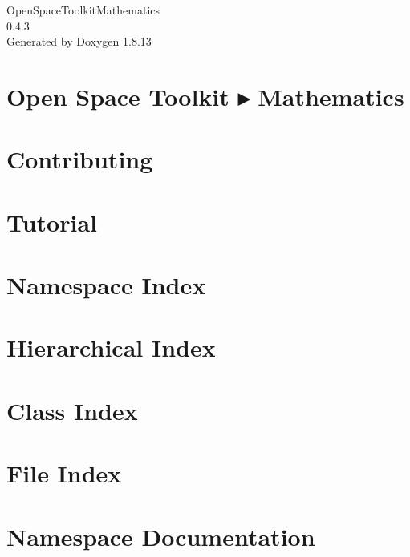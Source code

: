 \documentclass[twoside]{book}
\newcommand{\+}{\discretionary{\mbox{\scriptsize$\hookleftarrow$}}{}{}}
\newcommand{\clearemptydoublepage}{%
  \newpage{\pagestyle{empty}\cleardoublepage}%
}
\begin{document}
\hypersetup{pageanchor=false,
             bookmarksnumbered=true,
             pdfencoding=unicode
            }
\begin{titlepage}
\vspace*{7cm}
\begin{center}%
{\Large Open\+Space\+Toolkit\+Mathematics \\[1ex]\large 0.\+4.\+3 }\\
\vspace*{1cm}
{\large Generated by Doxygen 1.8.13}\\
\end{center}
\end{titlepage}
\clearemptydoublepage
{}
\tableofcontents
\clearemptydoublepage
{}
\hypersetup{pageanchor=true}

\chapter{Open Space Toolkit ▸ Mathematics}
\label{index}\hypertarget{index}{}
\chapter{Contributing}
\label{md__c_o_n_t_r_i_b_u_t_i_n_g}

\chapter{Tutorial}
\label{md_docs__tutorial}

\chapter{Namespace Index}

\chapter{Hierarchical Index}

\chapter{Class Index}

\chapter{File Index}

\chapter{Namespace Documentation}










\end{document}
